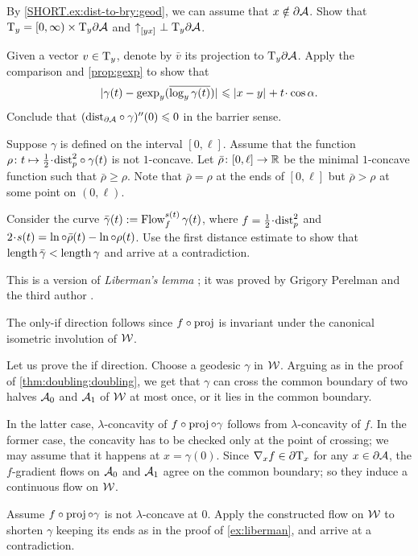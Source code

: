 By \ref{SHORT.ex:dist-to-bry:geod}, we can assume that $x\notin \partial \mathcal{A}$.
Show that $\mathrm{T}_y=[0,\infty)\times\mathrm{T}_y\partial \mathcal{A}$
and ${\uparrow}_{[{y}{x}]_{{}}}\perp \mathrm{T}_y\partial \mathcal{A}$.

Given a vector $v\in \mathrm{T}_y$, denote by $\bar v$ its projection to $\mathrm{T}_y\partial \mathcal{A}$.
Apply the comparison and \ref{prop:gexp} to show that 
\[\dist{\gamma(t)}{\gexp_y(\overline{\log_y\gamma(t)})}{}\le \dist{x}{y}{}+t\cdot\cos\alpha.\]
Conclude that $(\mathrm{dist}_{\partial \mathcal{A}}\circ\gamma)''(0)\leqslant 0$ in the barrier sense.

Suppose $\gamma$ is defined on the interval $[0,\ell]$.
Assume that the function $\rho\:t\mapsto \tfrac12\cdot\distfun_p^2\circ\gamma(t)$ is not $1$-concave.
Let $\bar\rho\colon[0,\ell]\to\mathbb{R}$ be the minimal $1$-concave function such that $\bar\rho\ge \rho$.
Note that $\bar\rho=\rho$ at the ends of $[0,\ell]$ but $\bar\rho>\rho$ at some point on $(0,\ell)$.

Consider the curve $\bar\gamma(t)\mathrel{:=} \mathop{\rm Flow}\nolimits_f^{s(t)}\gamma(t)$, where $f=\tfrac12\cdot\distfun_p^2$ and $2\cdot s(t)\z=\ln\circ\bar\rho(t)-\ln\circ\rho(t)$.
Use the first distance estimate to show that $\mathop{\rm length}\nolimits\bar\gamma<\mathop{\rm length}\nolimits\gamma$ and arrive at a contradiction.

This is a version of \emph{Liberman's lemma} \cite{liberman}; it was proved by Grigory Perelman and the third author \cite{perelman-petrunin}.

The only-if direction follows since $f\z\circ\proj$ is invariant under the canonical isometric involution of $\mathcal{W}$.

Let us prove the if direction.
Choose a geodesic $\gamma$ in $\mathcal{W}$.
Arguing as in the proof of \ref{thm:doubling:doubling}, we get 
that $\gamma$ can cross the common boundary of two halves $\mathcal{A}_0$ and $\mathcal{A}_1$ of $\mathcal{W}$ at most once, or it lies in the common boundary.

In the latter case, $\lambda$-concavity of $f\circ\operatorname{\rm proj}\nolimits\circ\gamma$ follows from $\lambda$-concavity of $f$.
In the former case, the concavity has to be checked only at the point of crossing;
we may assume that it happens at $x=\gamma(0)$.
Since $\nabla_xf\in\partial\mathrm{T}_x$ for any $x\in\partial\mathcal{A}$, the $f$-gradient flows on $\mathcal{A}_0$ and $\mathcal{A}_1$ agree on the common boundary; so they induce a continuous flow on $\mathcal{W}$.

Assume $f\circ\operatorname{\rm proj}\nolimits\circ\gamma$ is not $\lambda$-concave at $0$.
Apply the constructed flow on $\mathcal{W}$ to shorten $\gamma$ keeping its ends as in the proof of \ref{ex:liberman},
and arrive at a contradiction.

